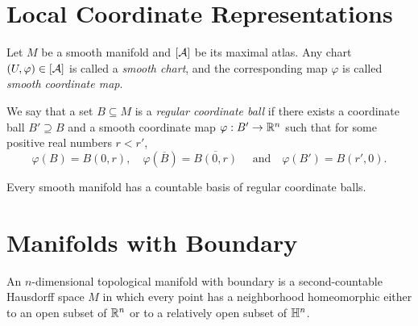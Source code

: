 \section{Local Coordinate Representations}
\begin{definition}
    Let $M$ be a smooth manifold and $[\mathcal{A}]$ be its maximal atlas. Any chart $(U,\varphi) \in [\mathcal{A}]$ is called a \textit{smooth chart}, and the corresponding map $\varphi$ is called \textit{smooth coordinate map}.
\end{definition}
\begin{definition}
    We say that a set $B \subseteq M$ is a \textit{regular coordinate ball} if there exists a coordinate ball $B' \supseteq B$ and a smooth coordinate map $\varphi: B' \to \mathbb{R}^n$ such that for some positive real numbers $r < r'$,
    \[
        \varphi(B) = B(0,r), \quad \varphi(\overline{B}) = \overline{B(0,r)} \quad \text{ and}\quad \varphi(B') = B(r',0).
    \]
\end{definition}
\begin{proposition}
    Every smooth manifold has a countable basis of regular coordinate balls.
\end{proposition}
\section{Manifolds with Boundary}
\begin{definition}
    An $n$-dimensional topological manifold with boundary is a second-countable Hausdorff space $M$ in which every point has a neighborhood homeomorphic either to an open subset of $\mathbb{R}^n$ or to a relatively open subset of $\mathbb{H}^n$.
\end{definition}
